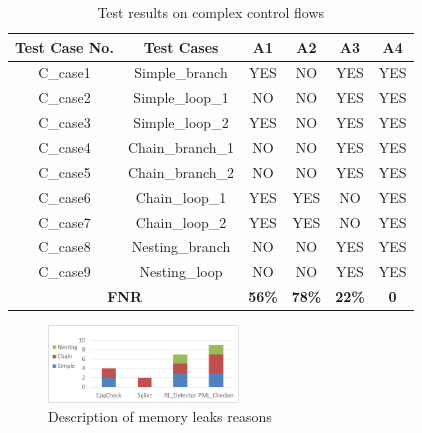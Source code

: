 \begin{table}[!h]
\center
\caption{Test results on complex control flows}\label{tab:2}
\begin{tabular}{|c|c|c|c|c|c|}
\hline
\textbf{Test Case No.} & \textbf{Test Cases} & \textbf{A1} & \textbf{A2} & \textbf{A}3 & \textbf{A4}\\
\hline
C\_case1	& Simple\_branch &	YES & NO & YES & YES\\
\hline
C\_case2	& Simple\_loop\_1 & NO &	NO & YES & YES\\
\hline
C\_case3	& Simple\_loop\_2	& YES &	NO & YES & YES\\
\hline
C\_case4	& Chain\_branch\_1 & NO & NO & YES & YES\\
\hline
C\_case5	& Chain\_branch\_2 &	NO	& NO & YES & YES\\
\hline
C\_case6	& Chain\_loop\_1 & YES & YES & NO & YES\\
\hline
C\_case7	& Chain\_loop\_2 & YES & YES & NO & YES\\
\hline
C\_case8	& Nesting\_branch & NO & NO & YES & YES\\
\hline
C\_case9 & Nesting\_loop & NO & NO & YES & YES\\
\hline
\multicolumn{2}{|c|}{\textbf{FNR}} & \textbf{56\%} & \textbf{78\%} & \textbf{22\%} & \textbf{0}\\
\hline
\end{tabular}
\end{table}

\begin{figure}
\center
\includegraphics[width=0.45\textwidth]{figure/fig8-fig12/fig8}
\caption{Description of memory leaks reasons}
\label{fig:8}
\end{figure}



